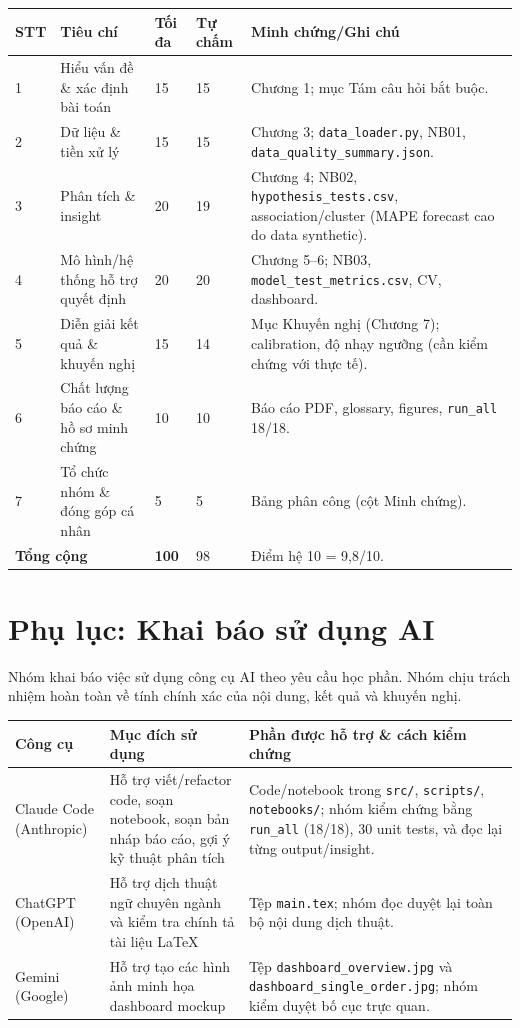 \documentclass[12pt,a4paper,oneside]{report}
\newcommand{\code}[1]{\nolinkurl{#1}}
\begin{document}
\begin{table}[H]
\centering
\small
\begin{tabularx}{\textwidth}{p{0.5cm}p{5.0cm}p{1.3cm}p{1.6cm}X}
\toprule
\textbf{STT} & \textbf{Tiêu chí} & \textbf{Tối đa} & \textbf{Tự chấm} &
\textbf{Minh chứng/Ghi chú}\\
\midrule
1 & Hiểu vấn đề \& xác định bài toán & 15 & 15 & Chương 1; mục Tám câu hỏi bắt buộc.\\
2 & Dữ liệu \& tiền xử lý & 15 & 15 & Chương 3; \code{data\_loader.py}, NB01, \code{data\_quality\_summary.json}.\\
3 & Phân tích \& insight & 20 & 19 & Chương 4; NB02, \code{hypothesis\_tests.csv}, association/cluster (MAPE forecast cao do data synthetic).\\
4 & Mô hình/hệ thống hỗ trợ quyết định & 20 & 20 & Chương 5--6; NB03, \code{model\_test\_metrics.csv}, CV, dashboard.\\
5 & Diễn giải kết quả \& khuyến nghị & 15 & 14 & Mục Khuyến nghị (Chương 7); calibration, độ nhạy ngưỡng (cần kiểm chứng với thực tế).\\
6 & Chất lượng báo cáo \& hồ sơ minh chứng & 10 & 10 & Báo cáo PDF, glossary, figures, \code{run\_all} 18/18.\\
7 & Tổ chức nhóm \& đóng góp cá nhân & 5 & 5 & Bảng phân công (cột Minh chứng).\\
\midrule
\multicolumn{2}{l}{\textbf{Tổng cộng}} & \textbf{100} & 98 & Điểm hệ 10 = 9,8/10.\\
\bottomrule
\end{tabularx}
\end{table}

\chapter{Phụ lục: Khai báo sử dụng AI}

Nhóm khai báo việc sử dụng công cụ AI theo yêu cầu học phần. Nhóm chịu trách
nhiệm hoàn toàn về tính chính xác của nội dung, kết quả và khuyến nghị.

\begin{table}[H]
\centering
\small
\begin{tabularx}{\textwidth}{p{3.0cm}p{4.2cm}X}
\toprule
\textbf{Công cụ} & \textbf{Mục đích sử dụng} & \textbf{Phần được hỗ trợ \& cách kiểm chứng}\\
\midrule
Claude Code (Anthropic) & Hỗ trợ viết/refactor code, soạn notebook, soạn bản nháp báo cáo, gợi ý kỹ thuật phân tích & Code/notebook trong \code{src/}, \code{scripts/}, \code{notebooks/}; nhóm kiểm chứng bằng \code{run\_all} (18/18), 30 unit tests, và đọc lại từng output/insight.\\
ChatGPT (OpenAI) & Hỗ trợ dịch thuật ngữ chuyên ngành và kiểm tra chính tả tài liệu LaTeX & Tệp \code{main.tex}; nhóm đọc duyệt lại toàn bộ nội dung dịch thuật.\\
Gemini (Google) & Hỗ trợ tạo các hình ảnh minh họa dashboard mockup & Tệp \code{dashboard_overview.jpg} và \code{dashboard_single_order.jpg}; nhóm kiểm duyệt bố cục trực quan.\\
\bottomrule
\end{tabularx}
\end{table}
\end{document}
